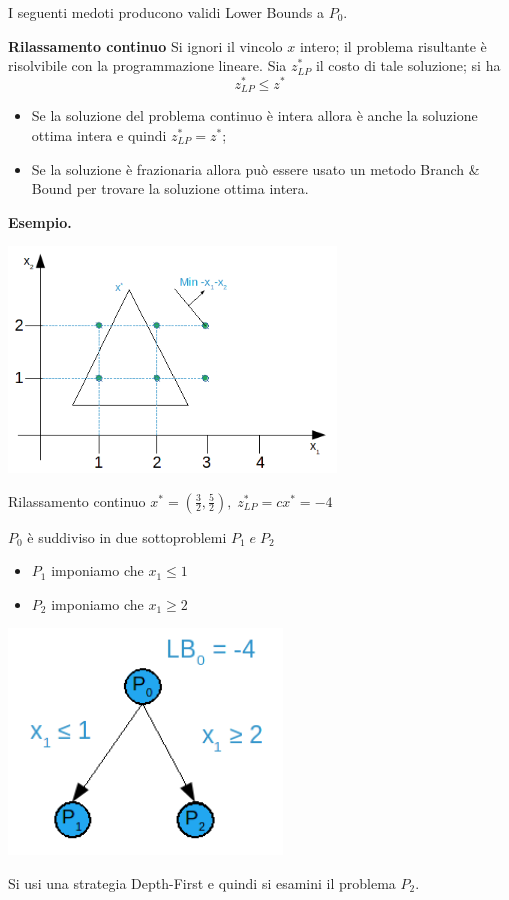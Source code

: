 I seguenti medoti producono validi Lower Bounds a $P_{0}$.

\textbf{Rilassamento continuo}
Si ignori il vincolo $x$ intero; il problema risultante è risolvibile con la programmazione lineare.\newline
Sia $z_{LP}^{*}$ il costo di tale soluzione; si ha
\begin{equation}
	z_{LP}^{*}\le z^{*}
\end{equation}

\begin{itemize}
	\item Se la soluzione del problema continuo è intera allora è anche la soluzione ottima intera e quindi $z_{LP}^{*}=z^{*}$;
	\item Se la soluzione è frazionaria allora può essere usato un metodo Branch \& Bound per trovare la soluzione ottima intera.
\end{itemize}

\textbf{Esempio.}

\centerline{\includegraphics[height=6cm]{images/graph19.png}}
Rilassamento continuo $x^{*}=(\frac{3}{2},\frac{5}{2}),\;z_{LP}^{*}=cx^{*}=-4$

$P_{0}$ è suddiviso in due sottoproblemi $P_{1}\;e\;P_{2}$
\begin{itemize}
	\item $P_{1}$ imponiamo che $x_{1}\le 1$
	\item $P_{2}$ imponiamo che $x_{1}\ge 2$
\end{itemize}

\centerline{\includegraphics[height=6cm]{images/graph20.png}}
Si usi una strategia Depth-First e quindi si esamini il problema $P_{2}$.

